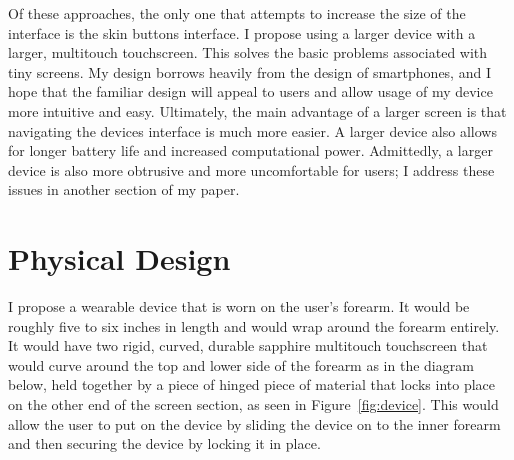 \documentclass[11pt]{article}
\begin{document}
Of these approaches, the only one that attempts to increase the size of the interface is the skin buttons interface. I propose using a larger device with a larger, multitouch touchscreen. This solves the basic problems associated with tiny screens. My design borrows heavily from the design of smartphones, and I hope that the familiar design will appeal to users and allow usage of my device more intuitive and easy. Ultimately, the main advantage of a larger screen is that navigating the devices interface is much more easier. A larger device also allows for longer battery life and increased computational power. Admittedly, a larger device is also more obtrusive and more uncomfortable for users; I address these issues in another section of my paper.

\section{Physical Design}
I propose a wearable device that is worn on the user's forearm. It would be roughly five to six inches in length and would wrap around the forearm entirely. It would have two rigid, curved, durable sapphire multitouch touchscreen that would curve around the top and lower side of the forearm as in the diagram below, held together by a piece of hinged piece of material that locks into place on the other end of the screen section, as seen in Figure~\ref{fig:device}. This would allow the user to put on the device by sliding the device on to the inner forearm and then securing the device by locking it in place. 
\end{document}
